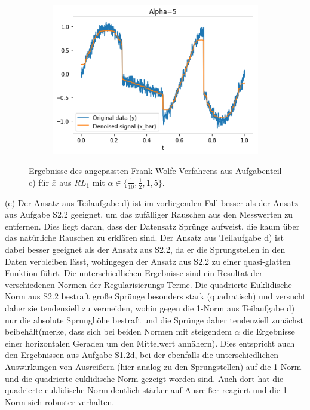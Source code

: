 \documentclass[ngerman, a4paper,12pt]{article}
\begin{document}
\begin{figure}[h]
\begin{subfigure}[b]{0.45\textwidth}
		\label{3a1}
	\end{subfigure}
	\begin{subfigure}[b]{0.45\textwidth}
		\includegraphics[width=1\columnwidth]{Images/3a5.png}
		\label{3a5}
	\end{subfigure}
	\caption{Ergebnisse des angepassten Frank-Wolfe-Verfahrens aus Aufgabenteil c) für $\bar{x}$ aus $RL_1$ mit $\alpha \in \{\frac{1}{10}, \frac{1}{2}, 1, 5\}$.}
	\vspace{-20pt}
\end{figure}
\par
(e) Der Ansatz aus Teilaufgabe d) ist im vorliegenden Fall besser als der Ansatz aus Aufgabe S2.2 geeignet, um das zufälliger Rauschen aus den Messwerten zu entfernen. Dies liegt daran, dass der Datensatz Sprünge aufweist, die kaum über das natürliche Rauschen zu erklären sind. Der Ansatz aus Teilaufgabe d) ist dabei besser geeignet als der Ansatz aus S2.2, da er die Sprungstellen in den Daten verbleiben lässt, wohingegen der Ansatz aus S2.2 zu einer quasi-glatten Funktion führt. Die unterschiedlichen Ergebnisse sind ein Resultat der verschiedenen Normen der Regularisierungs-Terme. Die quadrierte Euklidische Norm aus S2.2 bestraft große Sprünge besonders stark (quadratisch) und versucht daher sie tendenziell \glqq zu vermeiden\grqq, wohin gegen die 1-Norm aus Teilaufgabe d) nur die absolute Sprunghöhe bestraft und die Sprünge daher tendenziell zunächst \glqq beibehält\grqq (merke, dass sich bei beiden Normen mit steigendem $\alpha$ die Ergebnisse einer horizontalen Geraden um den Mittelwert annähern). Dies entspricht auch den Ergebnissen aus Aufgabe S1.2d, bei der ebenfalls die unterschiedlichen Auswirkungen von Ausreißern (hier analog zu den Sprungstellen) auf die 1-Norm und die quadrierte euklidische Norm gezeigt worden sind. Auch dort hat die quadrierte euklidische Norm deutlich stärker auf Ausreißer reagiert und die 1-Norm sich robuster verhalten.
\par
\end{document}
